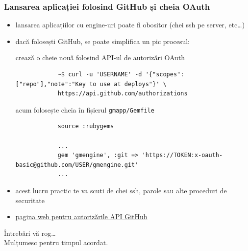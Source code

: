 \documentclass[compress]{beamer}
\begin{document}
\begin{frame}[fragile]
\frametitle{Lansarea aplicației folosind GitHub și cheia OAuth}
\begin{itemize}
  \item lansarea aplicațiilor cu engine-uri poate fi obositor (chei ssh pe server, etc\ldots)
  \item dacă folosești GitHub, se poate simplifica un pic procesul:
    \begin{itemize}
        \begin{item} crează o cheie nouă folosind API-ul de autorizări OAuth
          \begin{verbatim}
            ~$ curl -u 'USERNAME' -d '{"scopes":["repo"],"note":"Key to use at deploys"}' \
            https://api.github.com/authorizations
          \end{verbatim}
        \end{item}

        \begin{item} acum folosește cheia în fișierul \texttt{gmapp/Gemfile}
          \begin{verbatim}
            source :rubygems

            ...
            gem 'gmengine', :git => 'https://TOKEN:x-oauth-basic@github.com/USER/gmengine.git'
            ...
          \end{verbatim}
        \end{item}
    \end{itemize}
  \item acest lucru practic te va scuti de chei ssh, parole sau alte proceduri de securitate
  \item \href{http://developer.github.com/v3/oauth/#oauth-authorizations-api}{pagina web pentru autorizările API GitHub}
\end{itemize}
\end{frame}

\begin{frame}
  \begin{center}
  \huge Întrebări vă rog\ldots
  \\
  Mulțumesc pentru timpul acordat.
  \end{center}
\end{frame}
\end{document}
